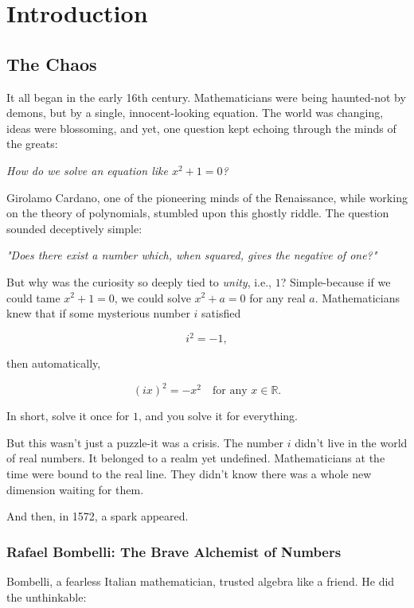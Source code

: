 \chapter{Introduction}

\section{The Chaos}

It all began in the early 16th century. Mathematicians were being haunted-not by demons, but by a single, innocent-looking equation. The world was changing, ideas were blossoming, and yet, one question kept echoing through the minds of the greats:

\emph{How do we solve an equation like $x^2 + 1 = 0$?}

Girolamo Cardano, one of the pioneering minds of the Renaissance, while working on the theory of polynomials, stumbled upon this ghostly riddle. The question sounded deceptively simple:

\begin{center}
\emph{"Does there exist a number which, when squared, gives the negative of one?"}
\end{center}

But why was the curiosity so deeply tied to \emph{unity}, i.e., $1$? Simple-because if we could tame $x^2 + 1 = 0$, we could solve $x^2 + a = 0$ for any real $a$. Mathematicians knew that if some mysterious number $i$ satisfied

\[
i^2 = -1,
\]

then automatically,

\[
(ix)^2 = -x^2 \quad \text{for any } x \in \mathbb{R}.
\]

In short, solve it once for $1$, and you solve it for everything.

But this wasn’t just a puzzle-it was a crisis. The number $i$ didn’t live in the world of real numbers. It belonged to a realm yet undefined. Mathematicians at the time were bound to the real line. They didn’t know there was a whole new dimension waiting for them.

And then, in 1572, a spark appeared.

\subsection*{Rafael Bombelli: The Brave Alchemist of Numbers}

Bombelli, a fearless Italian mathematician, trusted algebra like a friend. He did the unthinkable:

